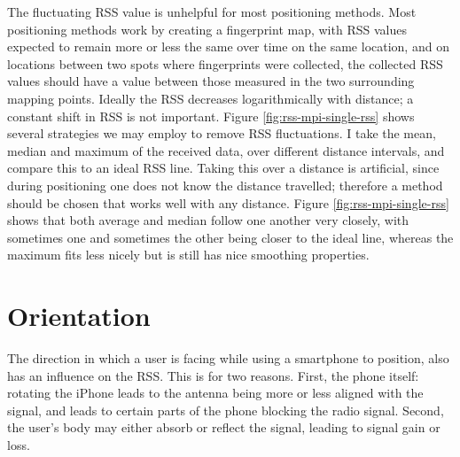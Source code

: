 
The fluctuating RSS value is unhelpful for most positioning methods.
Most positioning methods work by creating a fingerprint map, with RSS values expected to remain more or less the same over time on the same location, and on locations between two spots where fingerprints were collected, the collected RSS values should have a value between those measured in the two surrounding mapping points.
Ideally the RSS decreases logarithmically with distance; a constant shift in RSS is not important.
Figure \ref{fig:rss-mpi-single-rss} shows several strategies we may employ to remove RSS fluctuations.
I take the mean, median and maximum of the received data, over different distance intervals, and compare this to an ideal RSS line.
Taking this over a distance is artificial, since during positioning one does not know the distance travelled; therefore a method should be chosen that works well with any distance.
Figure \ref{fig:rss-mpi-single-rss} shows that both average and median follow one another very closely, with sometimes one and sometimes the other being closer to the ideal line, whereas the maximum fits less nicely but is still has nice smoothing properties.

\section{Orientation}
\label{sec:rss-rot}

The direction in which a user is facing while using a smartphone to position, also has an influence on the RSS.
This is for two reasons.
First, the phone itself: rotating the iPhone leads to the antenna being more or less aligned with the signal, and leads to certain parts of the phone blocking the radio signal.
Second, the user's body may either absorb or reflect the signal, leading to signal gain or loss.

